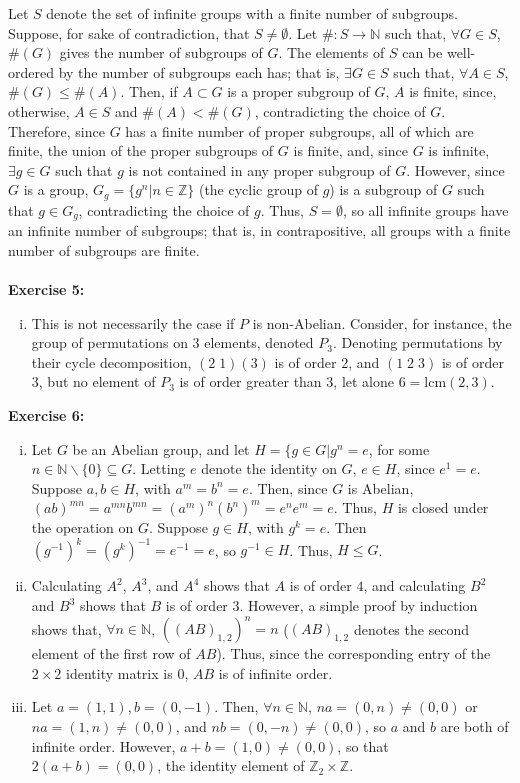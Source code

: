 \documentclass{article}%
\begin{document}
Let $S$ denote the set of infinite groups with
a finite number of subgroups. Suppose, for sake of contradiction, that
$S \neq \emptyset$. Let $\#: S \rightarrow \mathbb{N}$ such that, $\forall G \in
S$, $\#(G)$ gives the number of subgroups of $G$. The elements of $S$ can be
well-ordered by the number of subgroups each has; that is, $\exists G \in S$
such that, $\forall A \in S$,  $\#(G) \leq \#(A)$. Then, if $A \subset G$ is a
proper subgroup of $G$, $A$ is finite, since, otherwise, $A \in S$
and $\#(A) < \#(G)$, contradicting the choice of $G$. Therefore, since $G$ has
a finite number of proper subgroups, all of which are finite, the union of the
proper subgroups of $G$ is finite, and, since $G$ is infinite, $\exists g \in
G$ such that $g$ is not contained in any proper subgroup of $G$. However,
since $G$ is a group, $G_g = \{g^n | n \in \mathbb{Z}\}$ (the cyclic group of
$g$) is a subgroup of $G$ such that $g \in G_g$, contradicting the choice of
$g$. Thus, $S = \emptyset$, so all infinite groups have an infinite number of
subgroups; that is, in contrapositive, all groups with a finite number of
subgroups are finite. \\\\
\textbf{Exercise 5:} 
\begin{enumerate}[ii.]
	\item This is not necessarily the case if $P$ is
non-Abelian. Consider, for instance, the group of permutations on $3$ elements,
denoted $P_3$. Denoting permutations by their cycle decomposition, $(2\;1)(3)$
is of order $2$, and $(1\;2\;3)$ is of order $3$, but no element of $P_3$ is of
order greater than $3$, let alone $6 = \mbox{lcm}(2,3)$. \\

\end{enumerate}
\textbf{Exercise 6:} 
\begin{enumerate}[i.]
	\item Let $G$ be an Abelian group, and let $H = \{g \in G |
g^n = e$, for some $n \in \mathbb{N}\backslash\{0\} \subseteq G$.  
Letting $e$ denote the identity on $G$, $e \in H$, since $e^1 = e$.
Suppose $a, b \in H$, with $a^m = b^n = e$. Then, since $G$ is Abelian,
$(ab)^{mn} = a^{mn}b^{mn} = \left(a^m\right)^n \left(b^n\right)^m = e^ne^m
= e$. Thus, $H$ is closed under the operation on $G$.
Suppose $g \in H$, with $g^k = e$. Then $\left(g^{-1}\right)^k = \left(g^k
\right)^{-1} = e^{-1} = e$, so $g^{-1} \in H$.
Thus, $H \leq G$.
	\item  Calculating $A^2$, $A^3$, and $A^4$ shows that $A$ is
of order $4$, and calculating $B^2$ and $B^3$ shows that $B$ is of order $3$.
However, a simple proof by induction shows that, $\forall n \in \mathbb{N}$,
$\left((AB)_{1,2}\right)^n = n$ ($(AB)_{1,2}$ denotes the second element of the
first row of $AB$). Thus, since the corresponding entry of the $2 \times 2$
identity matrix is $0$, $AB$ is of infinite order.
	\item Let $a = (1,1), b = (0,-1)$. Then, $\forall n \in
\mathbb{N}$, $na = (0,n) \neq (0,0)$ or $na = (1,n) \neq (0,0)$, and $nb =
(0,-n) \neq (0,0)$, so $a$ and $b$ are both of infinite order. However, $a + b
= (1,0) \neq (0,0)$, so that $2(a + b) = (0,0)$, the identity element of
$\mathbb{Z}_2 \times \mathbb{Z}$.
\end{enumerate}
\end{document}

